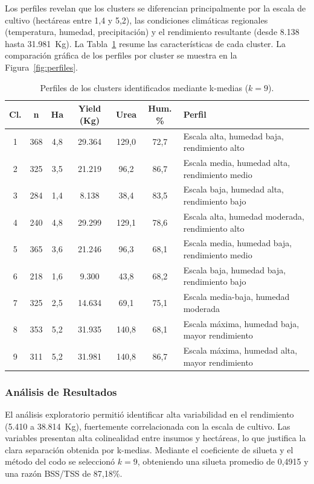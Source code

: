 \documentclass[10pt,a4paper]{article}
\begin{document}
Los perfiles revelan que los clusters se diferencian principalmente por la escala de cultivo (hectáreas entre 1,4 y 5,2), las condiciones climáticas regionales (temperatura, humedad, precipitación) y el rendimiento resultante (desde 8.138 hasta 31.981~Kg). La Tabla~\ref{tab:perfiles} resume las características de cada cluster. La comparación gráfica de los perfiles por cluster se muestra en la Figura~\ref{fig:perfiles}.

\begin{table}[H]
  \centering
  \caption{Perfiles de los clusters identificados mediante k-medias ($k = 9$).}
  \label{tab:perfiles}
  \footnotesize
  \begin{tabularx}{\textwidth}{c c c c c c X}
    \toprule
    \textbf{Cl.} & \textbf{n} & \textbf{Ha} & \textbf{Yield (Kg)} & \textbf{Urea} & \textbf{Hum. \%} & \textbf{Perfil} \\
    \midrule
    1 & 368 & 4,8 & 29.364 & 129,0 & 72,7 & Escala alta, humedad baja, rendimiento alto \\
    2 & 325 & 3,5 & 21.219 & 96,2  & 86,7 & Escala media, humedad alta, rendimiento medio \\
    3 & 284 & 1,4 & 8.138  & 38,4  & 83,5 & Escala baja, humedad alta, rendimiento bajo \\
    4 & 240 & 4,8 & 29.299 & 129,1 & 78,6 & Escala alta, humedad moderada, rendimiento alto \\
    5 & 365 & 3,6 & 21.246 & 96,3  & 68,1 & Escala media, humedad baja, rendimiento medio \\
    6 & 218 & 1,6 & 9.300  & 43,8  & 68,2 & Escala baja, humedad baja, rendimiento bajo \\
    7 & 325 & 2,5 & 14.634 & 69,1  & 75,1 & Escala media-baja, humedad moderada \\
    8 & 353 & 5,2 & 31.935 & 140,8 & 68,1 & Escala máxima, humedad baja, mayor rendimiento \\
    9 & 311 & 5,2 & 31.981 & 140,8 & 86,7 & Escala máxima, humedad alta, mayor rendimiento \\
    \bottomrule
  \end{tabularx}
\end{table}

\subsubsection{Análisis de Resultados}

El análisis exploratorio permitió identificar alta variabilidad en el rendimiento (5.410 a 38.814~Kg), fuertemente correlacionada con la escala de cultivo. Las variables presentan alta colinealidad entre insumos y hectáreas, lo que justifica la clara separación obtenida por k-medias. Mediante el coeficiente de silueta y el método del codo se seleccionó $k = 9$, obteniendo una silueta promedio de 0,4915 y una razón BSS/TSS de 87,18\%.
\end{document}
